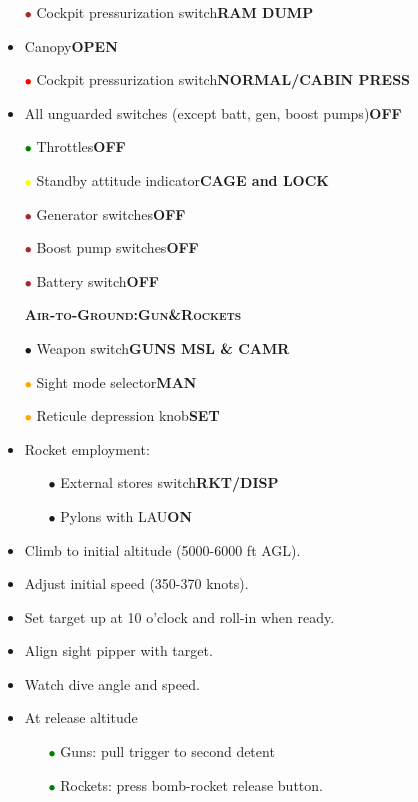 \documentclass[a4paper,12pt,dvipsnames]{letter}
\newcommand{\button}[1]{\textbf{#1}}
\newcommand{\myHead}[1]{{\LARGE\textsc{\textbf{#1}}}}
\newcommand{\bi}{\textcolor{ProcessBlue}{$\bullet$\;}}
\newcommand{\ri}{\textcolor{Red}{$\bullet$\;}}
\newcommand{\gi}{\textcolor{Green}{$\bullet$\;}}
\newcommand{\yi}{\textcolor{Yellow}{$\bullet$\;}}
\newcommand{\oi}{\textcolor{Orange}{$\bullet$\;}}
\renewcommand{\ni}{\textcolor{Brown}{$\bullet$\;}}
\begin{document}
{\begin{itemize}
 \item[\ni] Cockpit pressurization switch\dotfill\button{RAM DUMP}
 \item Canopy\dotfill\button{OPEN}
 \item[\ri] Cockpit pressurization switch\dotfill\button{NORMAL/CABIN PRESS}
 \item All unguarded switches (except batt, gen, boost pumps)\dotfill\button{OFF}
 \item[\gi] Throttles\dotfill\button{OFF}
 \item[\yi] Standby attitude indicator\dotfill\button{CAGE and LOCK}
 \item[\ni] Generator switches\dotfill\button{OFF}
 \item[\ni] Boost pump switches\dotfill\button{OFF}
 \item[\ni] Battery switch\dotfill\button{OFF}
\end{itemize}
\newpage
\begin{itemize}
 \item[] \myHead{Air-to-Ground:\;Gun\;\&\;Rockets}
 \item[\bi] Weapon switch\dotfill\button{GUNS MSL \& CAMR}
 \item[\oi] Sight mode selector\dotfill\button{MAN}
 \item[\oi] Reticule depression knob\dotfill\button{SET}
 \item Rocket employment:
 \begin{itemize}
   \item[\bi] External stores switch\dotfill\button{RKT/DISP}
   \item[\bi] Pylons with LAU\dotfill\button{ON}
 \end{itemize}
 \item Climb to initial altitude (5000-6000 ft AGL).
 \item Adjust initial speed (350-370 knots).
 \item Set target up at 10 o'clock and roll-in when ready.
 \item Align sight pipper with target.
 \item Watch dive angle and speed.
 \item At release altitude
 \begin{itemize}
  \item[\gi] Guns: pull trigger to second detent
  \item[\gi] Rockets: press bomb-rocket release button.
 \end{itemize}

\end{itemize}}
\end{document}

